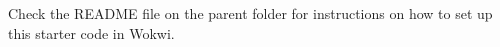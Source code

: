 Check the README file on the parent folder for instructions on how to set up this starter code in Wokwi. 